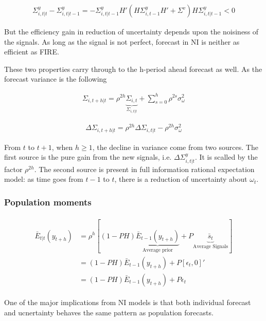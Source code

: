 \documentclass[]{article}
\begin{document}
\begin{eqnarray}
\Sigma^y_{i,t|t} - \Sigma^y_{i,t|t-1} = - \Sigma^y_{i,t|t-1} H'(H \Sigma^y_{i,t-1} H' +\Sigma^v) H \Sigma^y_{i,t|t-1} <0
\end{eqnarray}

But the efficiency gain in reduction of uncertainty depends upon the noisiness of the signals. As long as the signal is not perfect, forecast in NI is neither as efficient as FIRE. 

These two properties carry through to the h-period ahead forecast as well. As the forecast variance is the following 

\begin{eqnarray}
\Sigma_{i,t+h|t} = \rho^{2h} \underbrace{\Sigma_{i,t}}_{\Sigma_{i,t|t}} + \sum^{h}_{s=0}\rho^{2s} \sigma^2_{\omega}
\end{eqnarray}


\begin{eqnarray}
\Delta \Sigma_{i,t+h|t} = \rho^{2h}\Delta  \Sigma_{i,t|t}  - \rho^{2h} \sigma^2_{\omega}
\end{eqnarray}

From $t$ to $t+1$, when $h\geq 1$, the decline in variance come from two sources. The first source is the pure gain from the new signals, i.e. $\Delta \Sigma^y_{i,t|t}$. It is scalled by the factor $\rho^{2h}$. The second source is present in full information rational expectation model: as time goes from $t-1$ to $t$, there is a reduction of uncertainty about $\omega_t$.


\subsubsection{Population moments}

\begin{eqnarray}
\begin{aligned}
\bar E_{t|t} (y_{t+h}) & = \rho^h [(1-PH) \underbrace{\bar E_{t-1}(y_{t+h})}_{\text{Average prior}} + P \underbrace{\bar s_{t}}_{\text{Average Signals}}] \\
& = (1-PH) \bar E_{t-1}(y_{t+h}) + P [\epsilon_t, 0]' \\
& = (1-PH) \bar E_{t-1}(y_{t+h}) + P \epsilon_t
\end{aligned}
\end{eqnarray}

One of the major implications from NI models is that both individual forecast and ucnertainty behaves the same pattern as population forecasts. 
\end{document}
